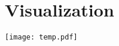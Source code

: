 \documentclass{article}
\begin{document}
                            \section*{Visualization}
                            \texttt{[image: temp.pdf]}
                            
\end{document}
